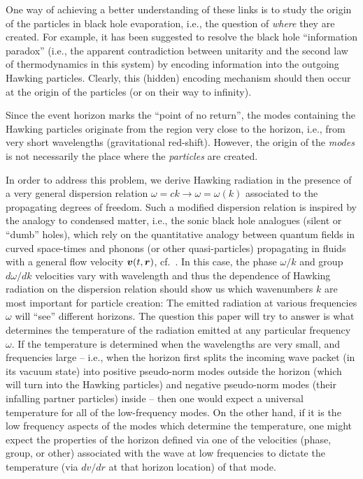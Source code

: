\documentclass[12pt,aps,prl,showpacs,amssymb,nofootinbib,onecolumn]{revtex4-2}
\newcommand{\f}[1]{\mbox{\boldmath$#1$}}
\newcommand{\vau}{\mbox{\boldmath$v$}}
\begin{document}
One way of achieving a better understanding of these links is to study
the origin of the particles in black hole evaporation, i.e., the
question of {\em where} they are created.
%
For example, it has been suggested to resolve the black hole 
``information paradox'' (i.e., the apparent contradiction between
unitarity and the second law of thermodynamics in this system) 
by encoding information into the outgoing Hawking particles.
%
Clearly, this (hidden) encoding mechanism should then occur at
the origin of the particles (or on their way to infinity). 

Since the event horizon marks the ``point of no return'', the modes 
containing the Hawking particles originate from the region very close
to the horizon, i.e., from very short wavelengths 
(gravitational red-shift). 
%
However, the origin of the {\em modes} is not necessarily the place
where the {\em particles} are created.

In order to address this problem, we derive Hawking radiation in the 
presence of a very general dispersion relation 
$\omega=ck\to\omega=\omega(k)$ associated to the propagating degrees
of freedom.
%
Such a modified dispersion relation is inspired by the analogy to 
condensed matter, i.e., the sonic black hole analogues 
(silent or ``dumb'' holes), which rely on the quantitative analogy
between quantum fields in curved space-times and phonons 
(or other quasi-particles) propagating in fluids with a general flow
velocity $\vau(t,\f{r})$, cf.~\cite{unruh-prl,jacobson}. 
%
In this case, the phase $\omega/k$ and group  $d\omega/dk$ velocities
vary with wavelength and thus the dependence of Hawking radiation on
the dispersion relation should show us which wavenumbers $k$ are most
important for particle creation: 
The emitted radiation at various frequencies $\omega$ will ``see'' 
different horizons. 
%
The question this paper will try to answer is what determines the
temperature of the radiation emitted at any particular frequency
$\omega$. 
%
If the temperature is determined when the wavelengths are very small, 
and frequencies large -- i.e., when the horizon first splits the
incoming wave packet (in its vacuum state) into positive pseudo-norm
modes outside the horizon (which will turn into the Hawking particles) 
and negative pseudo-norm modes (their infalling partner particles)
inside -- then one would expect a universal temperature for all of the
low-frequency modes. 
%
On the other hand, if it is the low frequency aspects of the modes
which determine the temperature, one might expect the properties of
the horizon defined via one of the velocities (phase, group, or other)
associated with the wave at low frequencies to dictate the temperature
(via $dv/dr$ at that horizon location) of that mode.
\end{document}
